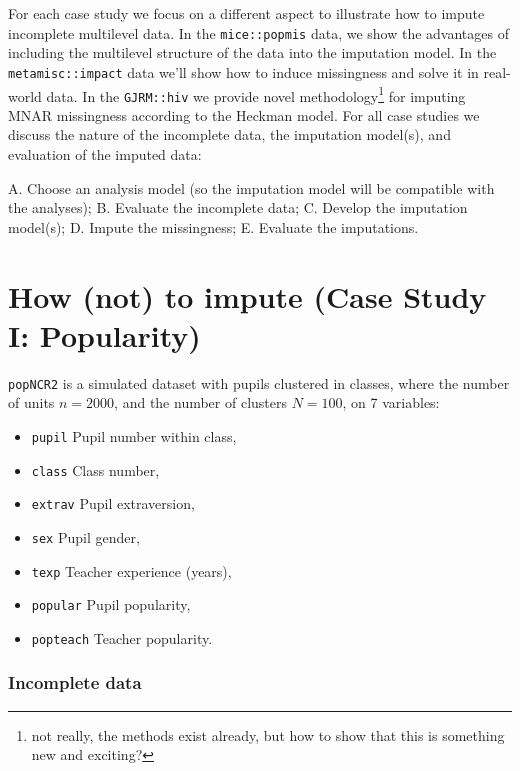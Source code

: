 \documentclass[
]{jss}
\providecommand{\tightlist}{%
  \setlength{\itemsep}{0pt}\setlength{\parskip}{0pt}}
\begin{document}
For each case study we focus on a different aspect to illustrate how to
impute incomplete multilevel data. In the \texttt{mice::popmis} data, we
show the advantages of including the multilevel structure of the data
into the imputation model. In the \texttt{metamisc::impact} data we'll
show how to induce missingness and solve it in real-world data. In the
\texttt{GJRM::hiv} we provide novel methodology\footnote{not really, the
  methods exist already, but how to show that this is something new and
  exciting?} for imputing MNAR missingness according to the Heckman
model. For all case studies we discuss the nature of the incomplete
data, the imputation model(s), and evaluation of the imputed data:

A. Choose an analysis model (so the imputation model will be compatible
with the analyses); B. Evaluate the incomplete data; C. Develop the
imputation model(s); D. Impute the missingness; E. Evaluate the
imputations.

\hypertarget{how-not-to-impute-case-study-i-popularity}{%
\section{How (not) to impute (Case Study I:
Popularity)}\label{how-not-to-impute-case-study-i-popularity}}

\texttt{popNCR2} is a simulated dataset with pupils clustered in
classes, where the number of units \(n = 2000\), and the number of
clusters \(N = 100\), on 7 variables:

\begin{itemize}
\tightlist
\item
  \texttt{pupil} Pupil number within class,
\item
  \texttt{class} Class number,
\item
  \texttt{extrav} Pupil extraversion,
\item
  \texttt{sex} Pupil gender,
\item
  \texttt{texp} Teacher experience (years),
\item
  \texttt{popular} Pupil popularity,
\item
  \texttt{popteach} Teacher popularity.
\end{itemize}

\hypertarget{incomplete-data}{%
\subsubsection{Incomplete data}\label{incomplete-data}}
\end{document}
